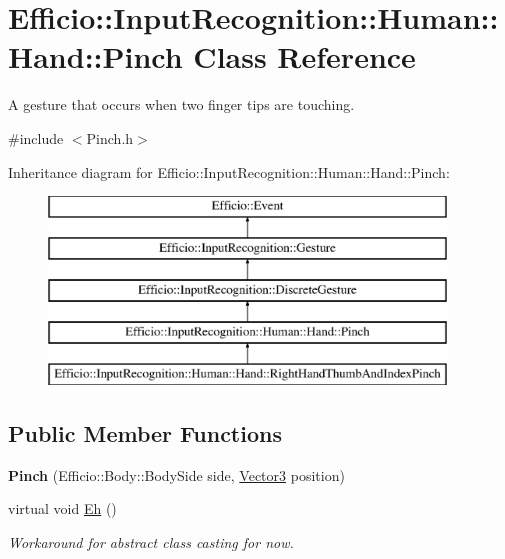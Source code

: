 \hypertarget{class_efficio_1_1_input_recognition_1_1_human_1_1_hand_1_1_pinch}{}\section{Efficio\+:\+:Input\+Recognition\+:\+:Human\+:\+:Hand\+:\+:Pinch Class Reference}
\label{class_efficio_1_1_input_recognition_1_1_human_1_1_hand_1_1_pinch}


A gesture that occurs when two finger tips are touching.  




{\ttfamily \#include $<$Pinch.\+h$>$}

Inheritance diagram for Efficio\+:\+:Input\+Recognition\+:\+:Human\+:\+:Hand\+:\+:Pinch\+:\begin{figure}[H]
\begin{center}
\leavevmode
\includegraphics[height=5.000000cm]{class_efficio_1_1_input_recognition_1_1_human_1_1_hand_1_1_pinch}
\end{center}
\end{figure}
\subsection*{Public Member Functions}
\begin{DoxyCompactItemize}
\item 
{\bfseries Pinch} (Efficio\+::\+Body\+::\+Body\+Side side, \hyperlink{class_efficio_1_1_vector3}{Vector3} position)\hypertarget{class_efficio_1_1_input_recognition_1_1_human_1_1_hand_1_1_pinch_a5519f098415cdeda129c08ac9f28380d}{}\label{class_efficio_1_1_input_recognition_1_1_human_1_1_hand_1_1_pinch_a5519f098415cdeda129c08ac9f28380d}

\item 
virtual void \hyperlink{class_efficio_1_1_input_recognition_1_1_human_1_1_hand_1_1_pinch_a3495ffd2e4fc8b48b9bbfc0f217ec466}{Eh} ()\hypertarget{class_efficio_1_1_input_recognition_1_1_human_1_1_hand_1_1_pinch_a3495ffd2e4fc8b48b9bbfc0f217ec466}{}\label{class_efficio_1_1_input_recognition_1_1_human_1_1_hand_1_1_pinch_a3495ffd2e4fc8b48b9bbfc0f217ec466}

\begin{DoxyCompactList}\small\item\em Workaround for abstract class casting for now. \end{DoxyCompactList}\end{DoxyCompactItemize}
